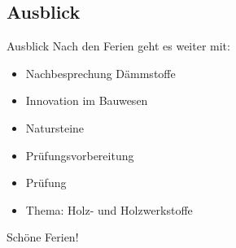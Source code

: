 
\folieFragen

\subsection{Ausblick}
\begin{frame}{Ausblick}
	Nach den Ferien geht es weiter mit: 
	\begin{itemize}
		\item [\textbullet] Nachbesprechung Dämmstoffe
		\item [\textbullet] Innovation im Bauwesen
		\item [\textbullet] Natursteine
		\item [\textbullet] Prüfungsvorbereitung
		\item [\textbullet] Prüfung
		\item [\textbullet] Thema: Holz- und Holzwerkstoffe
	\end{itemize}

\end{frame}

\begin{frame}{Schöne Ferien!}

\end{frame}


